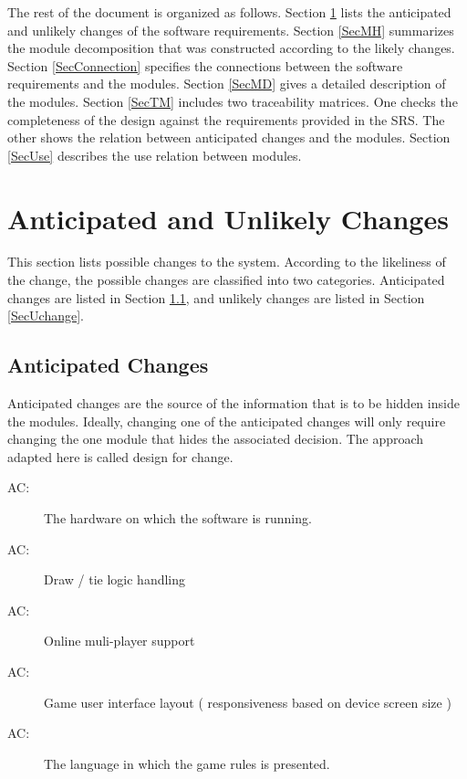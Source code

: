 \documentclass[12pt, titlepage]{article}
\newcounter{acnum}
\newcommand{\actheacnum}{AC\theacnum}
\begin{document}
The rest of the document is organized as follows. Section
\ref{SecChange} lists the anticipated and unlikely changes of the software
requirements. Section \ref{SecMH} summarizes the module decomposition that
was constructed according to the likely changes. Section \ref{SecConnection}
specifies the connections between the software requirements and the
modules. Section \ref{SecMD} gives a detailed description of the
modules. Section \ref{SecTM} includes two traceability matrices. One checks
the completeness of the design against the requirements provided in the SRS. The
other shows the relation between anticipated changes and the modules. Section
\ref{SecUse} describes the use relation between modules.

\section{Anticipated and Unlikely Changes} \label{SecChange}

This section lists possible changes to the system. According to the likeliness
of the change, the possible changes are classified into two
categories. Anticipated changes are listed in Section \ref{SecAchange}, and
unlikely changes are listed in Section \ref{SecUchange}.

\subsection{Anticipated Changes} \label{SecAchange}

Anticipated changes are the source of the information that is to be hidden
inside the modules. Ideally, changing one of the anticipated changes will only
require changing the one module that hides the associated decision. The approach
adapted here is called design for
change.

\begin{description}
\item[ \actheacnum \label{ac1}:] The hardware on which the software is running.
\item[ \actheacnum \label{ac2}:] Draw / tie logic handling
\item[ \actheacnum \label{ac3}:] Online muli-player support
\item[ \actheacnum :\label{ac4}] Game user interface layout ( responsiveness based on device screen size  )
\item[ \actheacnum \label{ac5}:] The language in which the game rules is presented.

\end{description}
\end{document}
